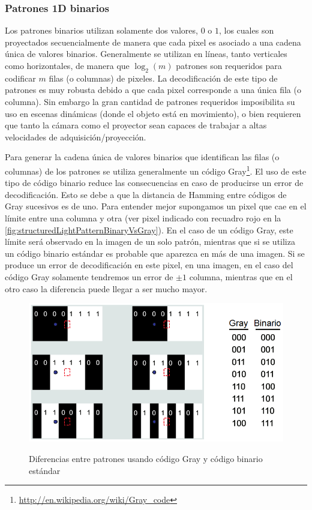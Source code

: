 \subsubsection{Patrones 1D binarios}
\label{sec:structuredLightBinary1DPatterns}
Los patrones binarios utilizan solamente dos valores, $0$ o $1$, los cuales son proyectados secuencialmente de manera que cada pixel es asociado a una cadena única de valores binarios. Generalmente se utilizan en líneas, tanto verticales como horizontales, de manera que $\log_2(m)$ patrones son requeridos para codificar $m$ filas (o columnas) de pixeles. La decodificación de este tipo de patrones es muy robusta debido a que cada pixel corresponde a una única fila (o columna). Sin embargo la gran cantidad de patrones requeridos imposibilita su uso en escenas dinámicas (donde el objeto está en movimiento), o bien requieren que tanto la cámara como el proyector sean capaces de trabajar a altas velocidades de adquisición/proyección.

Para generar la cadena única de valores binarios que identifican las filas (o columnas) de los patrones se utiliza generalmente un código Gray\footnote{\url{http://en.wikipedia.org/wiki/Gray_code}}. El uso de este tipo de código binario reduce las consecuencias en caso de producirse un error de decodificación. Esto se debe a que la distancia de Hamming entre códigos de Gray sucesivos es de uno. Para entender mejor supongamos un pixel que cae en el límite entre una columna y otra (ver pixel indicado con recuadro rojo en la \autoref{fig:structuredLightPatternBinaryVsGray}). En el caso de un código Gray, este límite será observado en la imagen de un solo patrón, mientras que si se utiliza un código binario estándar es probable que aparezca en más de una imagen. Si se produce un error de decodificación en este pixel, en una imagen, en el caso del código Gray solamente tendremos un error de $\pm1$ columna, mientras que en el otro caso la diferencia puede llegar a ser mucho mayor.

\begin{figure}[bth]
    \myfloatalign
        {\includegraphics[width=0.9\linewidth]{images/structuredLightPatternBinaryVsGray}}
        \caption{Diferencias entre patrones usando código Gray y código binario estándar}
        \label{fig:structuredLightPatternBinaryVsGray}
\end{figure}

